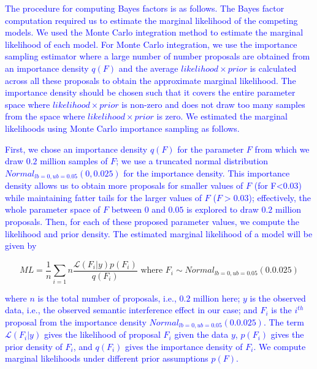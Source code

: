 \documentclass[a4paper, man, floatsintext]{apa7}
\begin{document}
{\textcolor{blue}{The procedure for computing Bayes factors is as follows. The Bayes factor computation required us to estimate the marginal likelihood of the competing models. We used the Monte Carlo integration method to estimate the marginal likelihood of each model. For Monte Carlo integration, we use the importance sampling estimator where a large number of number proposals are obtained from an importance density $q(F)$ and the average $likelihood \times prior$ is calculated across all these proposals to obtain the approximate marginal likelihood. The importance density should be chosen such that it covers the entire parameter space where $likelihood \times prior$ is non-zero and does not draw too many samples from the space where $likelihood \times prior$ is zero. We estimated the marginal likelihoods using Monte Carlo importance sampling as follows. }

\textcolor{blue}{First, we chose an importance density $q(F)$ for the parameter $F$ from which we draw $0.2$ million samples of $F$; we use a truncated normal distribution $Normal_{lb=0,ub=0.05}(0,0.025)$ for the importance density. This importance density allows us to obtain more proposals for smaller values of $F$ (for F<0.03) while maintaining fatter tails for the larger values of $F$ ($F>0.03$); effectively, the whole parameter space of $F$ between $0$ and $0.05$ is explored to draw $0.2$ million proposals. Then, for each of these proposed parameter values, we compute the likelihood and prior density. The estimated marginal likelihood of a model will be given by}

\begin{equation}
ML = \frac{1}{n} \sum_{i=1}{n} \frac{\mathcal{L}(F_i|y) p(F_i)}{q(F_i)} \text{ where } F_i \sim Normal_{lb=0,ub=0.05}(0.0.025) 
\end{equation}

\noindent \textcolor{blue}{where $n$ is the total number of proposals, i.e., $0.2$ million here; $y$ is the observed data, i.e., the observed semantic interference effect in our case; and $F_i$ is the $i^{th}$ proposal from the importance density $Normal_{lb=0,ub=0.05}(0.0.025) $. 
The term $\mathcal{L}(F_i|y)$ gives the likelihood of proposal $F_i$ given the data $y$, $p(F_i)$ gives the prior density of $F_i$, and $q(F_i)$ gives the importance density of $F_i$. We compute marginal likelihoods under different prior assumptions $p(F)$.}

}
\end{document}
